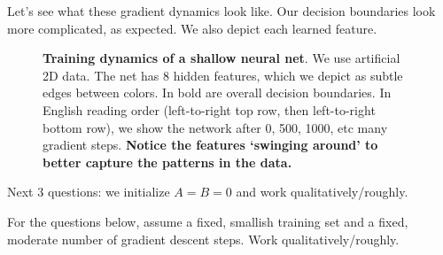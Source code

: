   Let's see what these gradient dynamics look like.
  Our decision boundaries
  look more complicated, as expected.  We also depict each learned feature.
        \begin{figure}[h]%
          \caption{\textbf{Training dynamics of a shallow neural net}.
            We use artificial 2D data.  The net has 8 hidden features, which we
            depict as subtle edges between colors.  In bold are overall
            decision boundaries.  In English reading order (left-to-right top
            row, then left-to-right bottom row), we show the network after 0,
            500, 1000, etc
            many gradient steps.
            \textbf{Notice the features `swinging around' to better capture the
            patterns in the data.}
            }
        \end{figure}

        Next $3$ questions: we initialize $A=B=0$ and work qualitatively/roughly.

        For the questions below, assume a fixed, smallish training set
        and a fixed, moderate number of gradient descent steps.
        Work qualitatively/roughly.

